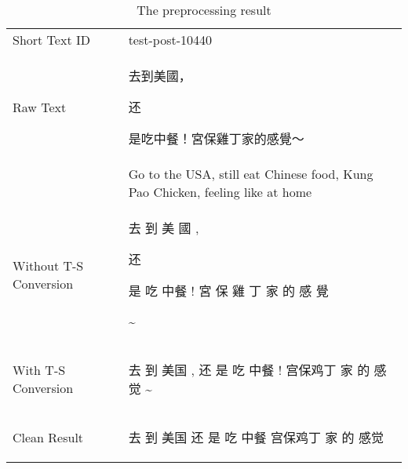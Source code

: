 \documentclass[aspectratio=169]{beamer}
\begin{document}
\begin{frame}

\begin{table}
\centering
\caption{The preprocessing result}
\begin{tabular}{l@{\qquad}l}
\hline\noalign{\smallskip}
Short Text ID & test-post-10440 \\
\noalign{\smallskip}
\hline
\noalign{\smallskip}
Raw Text          & \begin{CJK}{UTF8}{bsmi}去到美國，\begin{CJK}{UTF8}{gbsn}还\end{CJK}是吃中餐！宮保雞丁家的感覺～\end{CJK}  \\ 
 & Go to the USA, still eat Chinese food, Kung Pao Chicken, feeling like at home \\
\hline
\noalign{\smallskip}
Without T-S Conversion  & \begin{CJK}{UTF8}{bsmi}去 到 美 國 , \begin{CJK}{UTF8}{gbsn}还\end{CJK} 是 吃 中餐 ! 宮 保 雞 丁 家 的 感 覺 \end{CJK} \~{} \\
\hline
\noalign{\smallskip}
With T-S Conversion   & \begin{CJK}{UTF8}{gbsn}去 到 美国 , 还 是 吃 中餐 ! 宫保鸡丁 家 的 感觉 \~{}\end{CJK}   \\
\hline
\noalign{\smallskip}
Clean Result   & \begin{CJK}{UTF8}{gbsn}去 到 美国 还 是 吃 中餐 宫保鸡丁 家 的 感觉\end{CJK}   \\
\hline
\end{tabular}
\end{table}

\end{frame}
\end{document}
